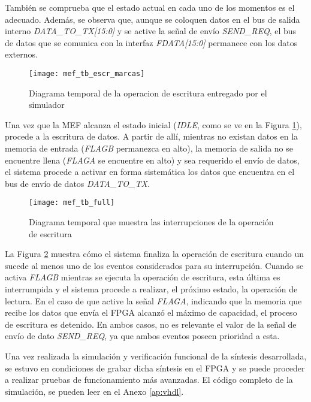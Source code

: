 También se comprueba que el estado actual en cada uno de los momentos es el adecuado. Además, se observa que, aunque se coloquen datos en el bus de salida interno {\it DATA\_TO\_TX[15:0]} y se active la señal de envío
{\it SEND\_REQ}, el bus de datos que se comunica con la interfaz {\it FDATA[15:0]} permanece con los datos externos.

\begin{figure}[t]
	\centering
	\texttt{[image: mef\_tb\_escr\_marcas]}
	\caption{Diagrama temporal de la operacion de escritura entregado por el simulador}
	\label{tb:escr}
\end{figure}

Una vez que la MEF alcanza el estado inicial ({\it IDLE}, como se ve en la Figura \ref{tb:escr}), procede a la escritura de datos. A partir de allí, mientras no existan datos en la memoria de entrada ({\it FLAGB} permanezca en alto), la memoria de salida no se encuentre llena ({\it FLAGA} se encuentre en alto) y sea requerido el envío de datos, el sistema procede a activar en forma sistemática los datos que encuentra en el bus de envío de datos {\it DATA\_TO\_TX}.

\begin{figure}[hb]
	\centering
	\texttt{[image: mef\_tb\_full]}
	\caption{Diagrama temporal que muestra las interrupciones de la operación de escritura}
	\label{tb:inter}
\end{figure}

La Figura \ref{tb:inter} muestra cómo el sistema finaliza la operación de escritura cuando un sucede al menos uno de los eventos considerados para su interrupción. Cuando se activa {\it FLAGB} mientras se ejecuta la operación de escritura, esta última es interrumpida y el sistema procede a realizar, el próximo estado, la operación de lectura. En el caso de que active la señal {\it FLAGA}, indicando que la memoria que recibe los datos que envía el FPGA alcanzó el máximo de capacidad, el proceso de escritura es detenido. En ambos casos, no es relevante el valor de la señal de envío de dato {\it SEND\_REQ}, ya que ambos eventos poseen prioridad a esta.
 
Una vez realizada la simulación y verificación funcional de la síntesis desarrollada, se estuvo en condiciones de grabar dicha síntesis en el FPGA y se puede proceder a realizar pruebas de funcionamiento más avanzadas. 
El código completo de la simulación, se pueden leer en el Anexo \ref{ap:vhdl}.